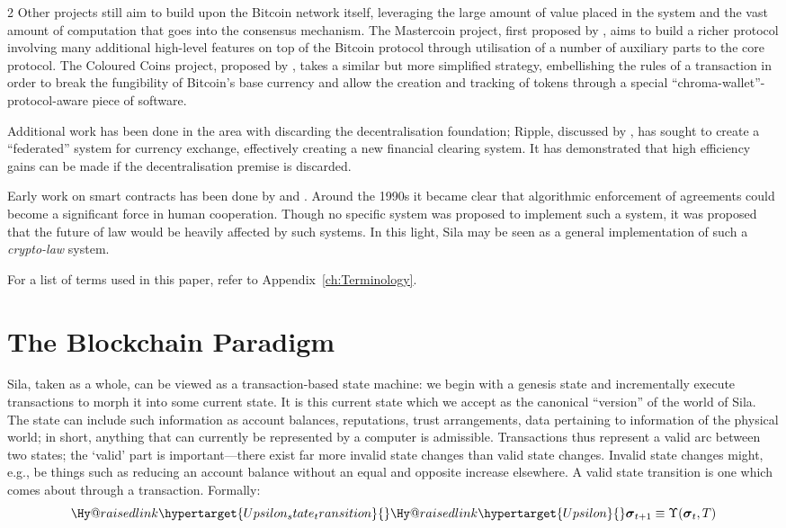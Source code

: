\documentclass[9pt,oneside]{amsart}
\makeatletter
\newcommand{\linkdest}[1]{\Hy@raisedlink{\hypertarget{#1}{}}}
\newcommand*\eg{e.g.\@\xspace}
\makeatother
\begin{document}
\begin{multicols}{2}
Other projects still aim to build upon the Bitcoin network itself, leveraging the large amount of value placed in the system and the vast amount of computation that goes into the consensus mechanism. The Mastercoin project, first proposed by \cite{mastercoin2013willett}, aims to build a richer protocol involving many additional high-level features on top of the Bitcoin protocol through utilisation of a number of auxiliary parts to the core protocol. The Coloured Coins project, proposed by \cite{colouredcoins2012rosenfeld}, takes a similar but more simplified strategy, embellishing the rules of a transaction in order to break the fungibility of Bitcoin's base currency and allow the creation and tracking of tokens through a special ``chroma-wallet''-protocol-aware piece of software.

Additional work has been done in the area with discarding the decentralisation foundation; Ripple, discussed by \cite{boutellier2014pirates}, has sought to create a ``federated'' system for currency exchange, effectively creating a new financial clearing system. It has demonstrated that high efficiency gains can be made if the decentralisation premise is discarded.

Early work on smart contracts has been done by \cite{szabo1997formalizing} and \cite{miller1997future}. Around the 1990s it became clear that algorithmic enforcement of agreements could become a significant force in human cooperation. Though no specific system was proposed to implement such a system, it was proposed that the future of law would be heavily affected by such systems. In this light, Sila may be seen as a general implementation of such a \textit{crypto-law} system.

For a list of terms used in this paper, refer to Appendix~\ref{ch:Terminology}.

\section{The Blockchain Paradigm} \label{ch:overview}

Sila, taken as a whole, can be viewed as a transaction-based state machine: we begin with a genesis state and incrementally execute transactions to morph it into some current state. It is this current state which we accept as the canonical ``version'' of the world of Sila. The state can include such information as account balances, reputations, trust arrangements, data pertaining to information of the physical world; in short, anything that can currently be represented by a computer is admissible. Transactions thus represent a valid arc between two states; the `valid' part is important---there exist far more invalid state changes than valid state changes. Invalid state changes might, \eg, be things such as reducing an account balance without an equal and opposite increase elsewhere. A valid state transition is one which comes about through a transaction. Formally:
\begin{equation}
\linkdest{Upsilon_state_transition}\linkdest{Upsilon}\boldsymbol{\sigma}_{t+1} \equiv \Upsilon(\boldsymbol{\sigma}_{t}, T)
\end{equation}


\end{multicols}
\end{document}
